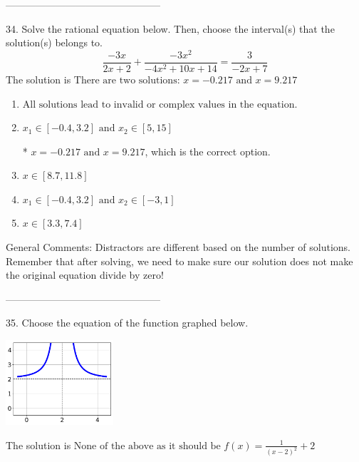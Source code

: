 \documentclass{article}[14pt]
\begin{document}
-----------------------------------------------

34. Solve the rational equation below. Then, choose the interval(s) that the solution(s) belongs to.
$$ \frac{-3x}{2x + 2} + \frac{-3x^{2}}{-4x^{2} +10 x + 14} = \frac{3}{-2x + 7} $$ 
The solution is $ \text{There are two solutions: } x = -0.217 \text{ and } x = 9.217 $ 

\begin{enumerate}[label=\Alph*.] 
\item $ \text{All solutions lead to invalid or complex values in the equation.} $ 

  
\item $ x_1 \in [-0.4, 3.2] \text{ and } x_2 \in [5,15] $ 

 * $x = -0.217 \text{ and } x = 9.217$, which is the correct option. 
\item $ x \in [8.7,11.8] $ 

  
\item $ x_1 \in [-0.4, 3.2] \text{ and } x_2 \in [-3,1] $ 

  
\item $ x \in [3.3,7.4] $ 

  
\end{enumerate} 
 
General Comments: Distractors are different based on the number of solutions. Remember that after solving, we need to make sure our solution does not make the original equation divide by zero!

-----------------------------------------------

35. Choose the equation of the function graphed below.
\begin{center} \includegraphics[width=0.3\textwidth]{../Figures/rationalGraphToEquationB.png} \end{center} 

The solution is $ \text{None of the above as it should be } f(x) = \frac{1}{(x - 2)^2} + 2 $ 
\end{document}
